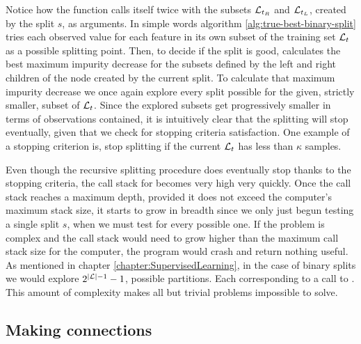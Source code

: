 Notice how the function \TrueBestSplit calls itself twice with the subsets
$\mathcal{L}_{t_R}$ and $\mathcal{L}_{t_L}$, created by the split $s$, as arguments. In simple words
algorithm \ref{alg:true-best-binary-split} tries each observed value for each
feature in its own subset of the training set $\mathcal{L}_t$ as a possible splitting
point. Then, to decide if the split is good, calculates the best maximum
impurity decrease for the subsets defined by the left and right children of the
node created by the current split. To calculate that maximum impurity decrease
we once again explore every split possible for the given, strictly smaller,
subset of $\mathcal{L}_t$. Since the explored subsets get progressively smaller in terms
of observations contained, it is intuitively clear that the splitting will stop
eventually, given that we check for stopping criteria satisfaction. One example
of a stopping criterion is, stop splitting if the current $\mathcal{L}_t$ has less
than $\kappa$ samples.

Even though the recursive splitting procedure does eventually stop thanks to the
stopping criteria, the call stack for \TrueBestSplit becomes very high very
quickly. Once the call stack reaches a maximum depth, provided it does not
exceed the computer's maximum stack size, it starts to grow in breadth since we
only just begun testing a single split $s$, when we must test for every possible
one. If the problem is complex and the call stack would need to grow higher than
the maximum call stack size for the computer, the program would crash and return
nothing useful. As mentioned in chapter \ref{chapter:SupervisedLearning}, in the
case of binary splits we would explore $2^{|\mathcal{L}| -1}-1$, possible partitions.
Each corresponding to a call to \TrueBestSplit. This amount of complexity makes
all but trivial problems impossible to solve. 

\subsection{Making connections}

